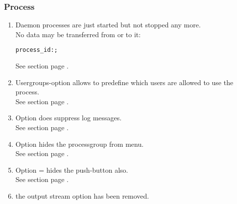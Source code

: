\subsubsection{Process}
\begin{enumerate}
\item Daemon processes are just started but not stopped any more.\\
No data may be transferred from or to it: \\

\begin{boxedminipage}[t]{\linewidth}
\begin{alltt}
  \PROCESS process_id: ;
\end{alltt}
\end{boxedminipage}

See section  page \pageref{sec:opprocess}. \\
\item Usergroups-option allows to predefine which users 
are allowed to use the process. \\
See section  page \pageref{sec:opprocessgroup}. \\
\item Option \NOLOG{} does suppress log messages.\\
See section  page \pageref{sec:opprocessgroup}. \\
\item Option \HIDDEN{} hides the processgroup from menu. \\
See section  page \pageref{sec:opprocessgroup}. \\
\item Option \FORM=\NONE{} hides the push-button also. \\
See section  page \pageref{sec:opprocessgroup}. \\
\item the output stream option \FORMAT{} has been removed. \\
\end{enumerate}
